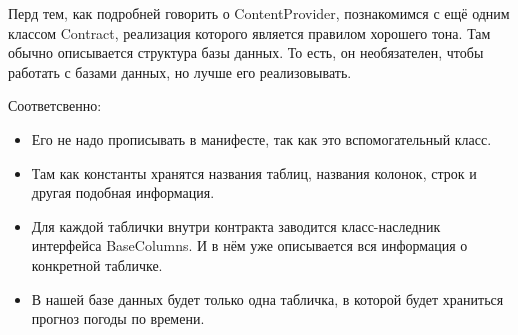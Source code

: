 \documentclass[12 pt]{article}
\begin{document}
	Перд тем, как подробней говорить о ContentProvider, познакомимся с ещё одним классом Contract, реализация которого является правилом хорошего тона. Там обычно описывается структура базы данных. То есть, он необязателен, чтобы работать с базами данных, но лучше его реализовывать.
	
	Соответсвенно:
	\begin{itemize}
	    \item Его не надо прописывать в манифесте, так как это вспомогательный класс.
	    \item Там как константы хранятся названия таблиц, названия колонок, строк и другая подобная информация.
	    \item Для каждой таблички внутри контракта заводится класс-наследник интерфейса BaseColumns. И в нём уже описывается вся информация о конкретной табличке. 
	    \item В нашей базе данных будет только одна табличка, в которой будет храниться прогноз погоды по времени.
	\end{itemize}
	
\end{document}
